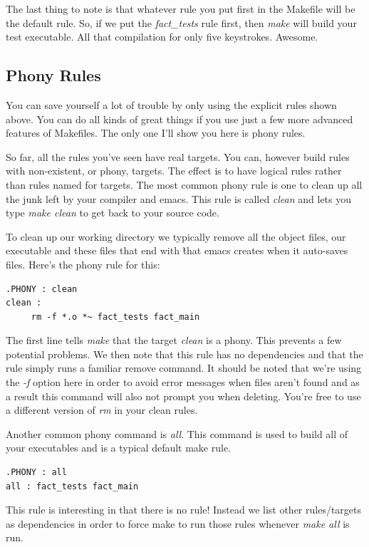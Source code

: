 \documentclass[]{tufte-handout}
\begin{document}
The last thing to note is that whatever rule you put first in the Makefile will be the default rule. So, if we put the \textit{fact\_tests} rule first, then \textit{make} will build your test executable. All that compilation for only five keystrokes. Awesome.  

\subsection{Phony Rules}

You can save yourself a lot of trouble by only using the explicit rules shown above. You can do all kinds of great things if you use just a few more advanced features of Makefiles. The only one I'll show you here is phony rules.  

So far, all the rules you've seen have real targets.  You can, however build rules with non-existent, or phony, targets.  The effect is to have logical rules rather than rules named for targets. The most common phony rule is one to clean up all the junk left by your compiler and emacs. This rule is called \textit{clean} and lets you type \textit{make clean} to get back to your source code.

To clean up our working directory we typically remove all the object files, our executable and these files that end with \~ that emacs creates when it auto-saves files. Here's the phony rule for this:
\begin{verbatim}
.PHONY : clean
clean : 
     rm -f *.o *~ fact_tests fact_main 
\end{verbatim}
The first line tells \textit{make} that the target \textit{clean} is a phony. This prevents a few potential problems.  We then note that this rule has no dependencies and that the rule simply runs a familiar remove command. It should be noted that we're using the \textit{-f} option here in order to avoid error messages when files aren't found and as a result this command will also not prompt you when deleting. You're free to use a different version of \textit{rm} in your clean rules. 

Another common phony command is \textit{all}. This command is used to build all of your executables and is a typical default make rule.
\begin{verbatim}
.PHONY : all
all : fact_tests fact_main
\end{verbatim}
This rule is interesting in that there is no rule! Instead we list other rules/targets as dependencies in order to force make to run those rules whenever \textit{make all} is run. 
\end{document}
